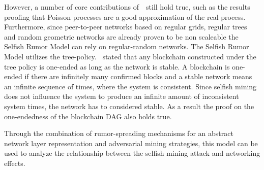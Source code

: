 However, a number of core contributions of~~still hold true, such as the results proofing that Poisson processes are a good approximation of the real process. Furthermore, since peer-to-peer networks based on regular grids, regular trees and random geometric networks are already proven to be non scaleable the Selfish Rumor Model can rely on regular-random networks. The Selfish Rumor Model utilizes the tree-policy. ~stated that any blockchain constructed under the tree policy is one-ended as long as the network is stable. A blockchain is one-ended if there are infinitely many confirmed blocks and a stable network means an infinite sequence of times, where the system is consistent. Since selfish mining does not influence the system to produce an infinite amount of inconsistent system times, the network has to considered stable. As a result the proof on the one-endedness of the blockchain DAG also holds true.

Through the combination of rumor-spreading mechanisms for an abstract network layer representation and adversarial mining strategies, this model can be used to analyze the relationship between the selfish mining attack and networking effects.




